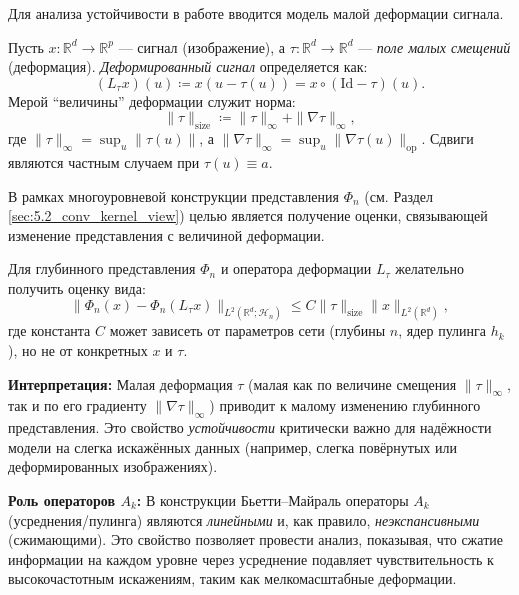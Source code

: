\documentclass[../NDCNNAI_main.tex]{subfiles}
\begin{document}
Для анализа устойчивости в работе \cite{Bietti_Group} вводится модель малой деформации сигнала.

\begin{definition}
\label{def:deformation_operator}
Пусть \( x: \mathbb{R}^d \to \mathbb{R}^p \) --- сигнал (изображение), а \( \tau: \mathbb{R}^d \to \mathbb{R}^d \) --- \emph{поле малых смещений} (деформация). \emph{Деформированный сигнал} определяется как:
\[
(L_\tau x)(u) \coloneq x(u - \tau(u)) = x \circ (\mathrm{Id} - \tau)(u).
\]
Мерой ``величины'' деформации служит норма:
\[
\| \tau \|_{\text{size}} \coloneq \|\tau\|_\infty + \|\nabla \tau\|_\infty,
\]
где \( \|\tau\|_\infty = \sup_u \|\tau(u)\| \), а \( \|\nabla \tau\|_\infty = \sup_u \|\nabla \tau(u)\|_{\text{op}} \). Сдвиги являются частным случаем при \( \tau(u) \equiv a \).
\end{definition}

В рамках многоуровневой конструкции представления \( \Phi_n \) (см. Раздел \ref{sec:5.2_conv_kernel_view}) целью является получение оценки, связывающей изменение представления с величиной деформации.

\begin{definition}
\label{def:desired_stability_bound}
Для глубинного представления \( \Phi_n \) и оператора деформации \( L_\tau \) желательно получить оценку вида:
\[
\| \Phi_n(x) - \Phi_n(L_\tau x) \|_{L^2(\mathbb{R}^d; \mathcal{H}_n)} \leq C \| \tau \|_{\text{size}} \| x \|_{L^2(\mathbb{R}^d)},
\]
где константа \( C \) может зависеть от параметров сети (глубины \( n \), ядер пулинга \( h_k \)), но не от конкретных \( x \) и \( \tau \).
\end{definition}
\textbf{Интерпретация:} Малая деформация \( \tau \) (малая как по величине смещения \( \|\tau\|_\infty \), так и по его градиенту \( \|\nabla \tau\|_\infty \)) приводит к малому изменению глубинного представления. Это свойство \emph{устойчивости} критически важно для надёжности модели на слегка искажённых данных (например, слегка повёрнутых или деформированных изображениях).

\textbf{Роль операторов \( A_k \):} В конструкции Бьетти--Майраль \cite{Bietti_Group} операторы \( A_k \) (усреднения/пулинга) являются \emph{линейными} и, как правило, \emph{неэкспансивными} (сжимающими). Это свойство позволяет провести анализ, показывая, что сжатие информации на каждом уровне через усреднение подавляет чувствительность к высокочастотным искажениям, таким как мелкомасштабные деформации.
\end{document}
